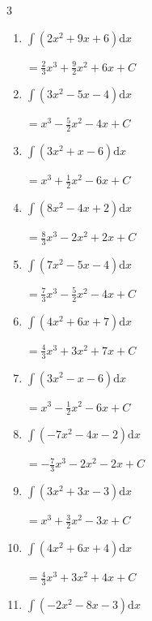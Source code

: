 \begin{multicols}{3}
\begin{enumerate}
  \item $\displaystyle \int \left( 2x^{2}+9x+6 \right) \mathrm{d}x$

        $\displaystyle =\frac{2}{3}x^{3}+\frac{9}{2}x^{2}+6x+ C$

  \item $\displaystyle \int \left( 3x^{2}-5x-4 \right) \mathrm{d}x$

        $\displaystyle =x^{3}-\frac{5}{2}x^{2}-4x+ C$

  \item $\displaystyle \int \left( 3x^{2}+x-6 \right) \mathrm{d}x$

        $\displaystyle =x^{3}+\frac{1}{2}x^{2}-6x+ C$

  \item $\displaystyle \int \left( 8x^{2}-4x+2 \right) \mathrm{d}x$

        $\displaystyle =\frac{8}{3}x^{3}-2x^{2}+2x+ C$

  \item $\displaystyle \int \left( 7x^{2}-5x-4 \right) \mathrm{d}x$

        $\displaystyle =\frac{7}{3}x^{3}-\frac{5}{2}x^{2}-4x+ C$

  \item $\displaystyle \int \left( 4x^{2}+6x+7 \right) \mathrm{d}x$

        $\displaystyle =\frac{4}{3}x^{3}+3x^{2}+7x+ C$

  \item $\displaystyle \int \left( 3x^{2}-x-6 \right) \mathrm{d}x$

        $\displaystyle =x^{3}-\frac{1}{2}x^{2}-6x+ C$

\columnbreak %

  \item $\displaystyle \int \left( -7x^{2}-4x-2 \right) \mathrm{d}x$

        $\displaystyle =-\frac{7}{3}x^{3}-2x^{2}-2x+ C$

  \item $\displaystyle \int \left( 3x^{2}+3x-3 \right) \mathrm{d}x$

        $\displaystyle =x^{3}+\frac{3}{2}x^{2}-3x+ C$

  \item $\displaystyle \int \left( 4x^{2}+6x+4 \right) \mathrm{d}x$

        $\displaystyle =\frac{4}{3}x^{3}+3x^{2}+4x+ C$

  \item $\displaystyle \int \left( -2x^{2}-8x-3 \right) \mathrm{d}x$


\end{enumerate}
\end{multicols}
